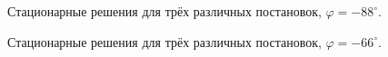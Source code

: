 \documentclass[14pt, a4paper, fleqn]{extarticle}
\begin{document}
\begin{figure}[H]
\caption{Стационарные решения для трёх различных постановок, $\varphi = -88^\circ$.}
\end{figure}

\begin{figure}[H]
\caption{Стационарные решения для трёх различных постановок, $\varphi = -66^\circ$.}
\end{figure}
\end{document}

